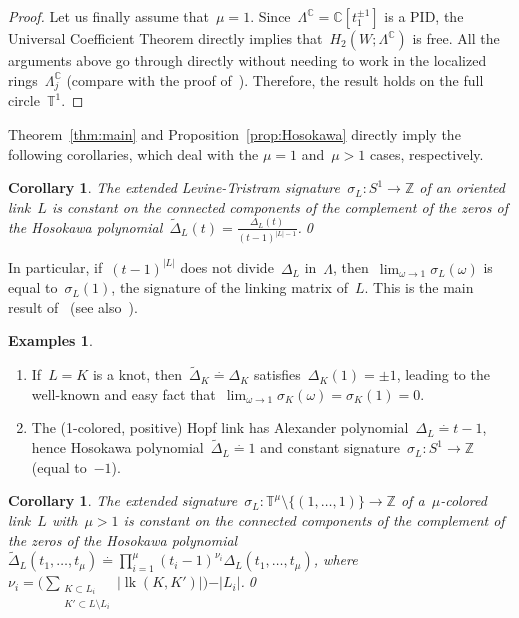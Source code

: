 \documentclass{amsart}
\newcommand{\Z}{\mathbb{Z}}
\newcommand{\C}{\mathbb{C}}
\newcommand{\T}{\mathbb{T}}
\DeclareMathOperator{\lk}{lk}
\newcommand{\de}{\stackrel{\cdot}{=}}
\newcommand{\LambdaC}{\Lambda^{\mathbb{C}}}
\newtheorem{cor}[thm]{Corollary}
\theoremstyle{definition}
\newtheorem{exs}[thm]{Examples}
\theoremstyle{remark}
\begin{document}
\begin{proof}
		Let us finally assume that~$\mu = 1$. Since~$\LambdaC = \C[t_1^{\pm 1}]$ is a PID, the Universal Coefficient Theorem directly implies that~$H_2(W;\LambdaC)$ is free. All the arguments above go through directly without needing to work in the localized rings~$\LambdaC_j$ (compare with the proof of~\cite[Lemma B.1]{CMP23}). Therefore, the result holds on the full circle~$\T^1$.
	\end{proof} 
	
	Theorem~\ref{thm:main} and Proposition~\ref{prop:Hosokawa} directly imply the following corollaries,
	which deal with the $\mu=1$ and~$\mu>1$ cases, respectively.
	
	\begin{cor}
	\label{cor:cont1}
	The extended Levine-Tristram signature~$\sigma_L\colon S^1\to\Z$ of an oriented link~$L$ is constant on
	the connected components of the complement of the zeros of the Hosokawa polynomial~$\widetilde\Delta_L(t)=\frac{\Delta_L(t)}{(t-1)^{|L|-1}}$.\qed
	\end{cor}
	
	In particular, if~$(t-1)^{|L|}$ does not divide~$\Delta_L$ in~$\Lambda$, then~$\lim_{\omega\to 1}\sigma_L(\omega)$ is equal to~$\sigma_L(1)$, the signature of the linking matrix of~$L$.
	This is the main result of~\cite{BZ22} (see also~\cite{CMP23}).

	\begin{exs}
	\begin{enumerate}
	\item If~$L=K$ is a knot, then~$\widetilde\Delta_K\de\Delta_K$ satisfies~$\Delta_K(1)=\pm 1$, leading to the well-known and easy fact that~$\lim_{\omega\to 1}\sigma_K(\omega)=\sigma_K(1)=0$.
	\item The (1-colored, positive) Hopf link has Alexander polynomial~$\Delta_L\de t-1$, hence Hosokawa
	polynomial~$\widetilde\Delta_L\de 1$ and constant signature~$\sigma_L\colon S^1\to\Z$ (equal to~$-1$).
	\end{enumerate}
	\end{exs}
	
	\begin{cor}
	\label{cor:cont2}
	The extended signature~$\sigma_L\colon \T^\mu\setminus\{(1,\dots,1)\}\to\Z$ of a~$\mu$-colored link~$L$ with~$\mu>1$ 
	is constant on the connected components of the complement of the zeros of the Hosokawa polynomial
	$\widetilde\Delta_L(t_1,\dots,t_\mu)\stackrel{\cdot}{=}\prod_{i=1}^\mu (t_i-1)^{\nu_i}\Delta_L(t_1,\dots,t_\mu)$, where $\nu_i=\Big(\sum_{\substack{K\subset L_i\\ K'\subset L\setminus L_i}}\vert\lk(K,K')\vert\Big)-\vert L_i\vert$.\qed
	\end{cor}
	
\end{document}
